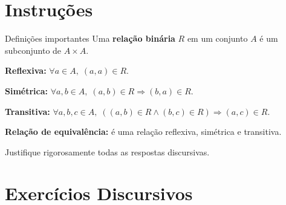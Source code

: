 \documentclass[12pt]{article}
\begin{document}
\vspace*{0.2cm}

\section*{Instruções}
\begin{block}{Definições importantes}
Uma \textbf{relação binária} $R$ em um conjunto $A$ é um subconjunto de $A \times A$.

\textbf{Reflexiva:} $\forall a \in A,\; (a,a) \in R$.

\textbf{Simétrica:} $\forall a, b \in A,\; (a,b) \in R \Rightarrow (b,a) \in R$.

\textbf{Transitiva:} $\forall a, b, c \in A,\; ((a,b) \in R \land (b,c) \in R) \Rightarrow (a,c) \in R$.

\textbf{Relação de equivalência:} é uma relação reflexiva, simétrica e transitiva.
\end{block}
Justifique rigorosamente todas as respostas discursivas.

\section*{Exercícios Discursivos}
\end{document}

